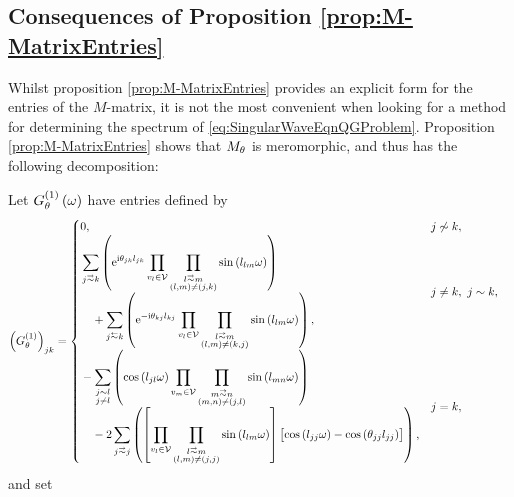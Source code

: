 \subsection{Consequences of Proposition \ref{prop:M-MatrixEntries}} \label{ssec:MMatrixConsequences}
Whilst proposition \ref{prop:M-MatrixEntries} provides an explicit form for the entries of the $M$-matrix,  it is not the most convenient when looking for a method for determining the spectrum of \eqref{eq:SingularWaveEqnQGProblem}.
Proposition \ref{prop:M-MatrixEntries} shows that $M_\theta$ is meromorphic, and thus has the following decomposition:
\begin{cory} \label{cory:M-MatrixEntriesNoPoles}
	Let $G^{(1)}_\theta\left( \omega \right)$ have entries defined by
	\begin{align*}
		\bracs{G^{(1)}_\qm}_{jk} &= 
		\begin{cases}
			\!\begin{aligned}
				&0,
			\end{aligned}			
			& j \not\con k, \\
			\!\begin{aligned}
				&\sum_{j\conLeft k} \bracs{ \e^{\rmi\qm_{jk}l_{jk}} \prod_{v_l\in\vertSet}\prod_{\substack{ l\conLeft m \\ \bracs{l,m} \neq \bracs{j,k} }}\sin\bracs{l_{lm}\omega} }
				\\ &\quad + \sum_{j\conRight k} \bracs{ \e^{-\rmi\qm_{kj}l_{kj}} \prod_{v_l\in\vertSet}\prod_{\substack{l\conLeft m \\ \bracs{l,m} \neq \bracs{k,j} }}\sin\bracs{l_{lm}\omega} },
			\end{aligned}
			& j\neq k, \ j\con k, \\
			\!\begin{aligned}
				&- \sum_{\substack{j\con l \\ j\neq l}} \bracs{ \cos\bracs{l_{jl}\omega}\prod_{v_m\in\vertSet}\prod_{\substack{ m\conLeft n \\ \bracs{m,n}\neq\bracs{j,l} }}\sin\bracs{l_{mn}\omega} }
				\\ &\quad - 2\sum_{j\conLeft j} \bracs{ \sqbracs{ \prod_{v_l\in\vertSet}\prod_{\substack{l\conLeft m \\ \bracs{l,m}\neq\bracs{j,j} }}\sin\bracs{l_{lm}\omega} }\bigl[ \cos\bracs{l_{jj}\omega} - \cos\bracs{\qm_{jj}l_{jj}} \bigr] },
			\end{aligned}
			& j=k,
		\end{cases}
	\end{align*}
	and set
	\begin{align*}

\end{align*}
\end{cory}
